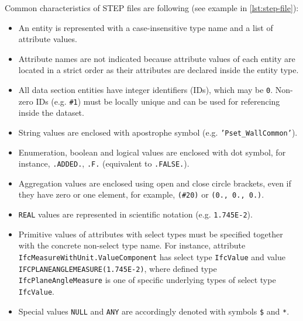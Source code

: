 Common characteristics of STEP files are following (see example in \autoref{lst:step-file}):
\begin{itemize}

    \item An entity is represented with a case-insensitive type name and a list of attribute values.    
    
    \item Attribute names are not indicated because attribute values of each entity are located in a strict order as their attributes are declared inside the entity type.
    
    \item All data section entities have integer identifiers (IDs), which may be \texttt{0}.
    Non-zero IDs (e.g. \texttt{\#1}) must be locally unique and can be used for referencing inside the dataset.
    
    \item String values are enclosed with apostrophe symbol (e.g. \texttt{'Pset\_WallCommon'}).
    
    \item Enumeration, boolean and logical values are enclosed with dot symbol, for instance, \texttt{.ADDED.}, \texttt{.F.} (equivalent to \texttt{.FALSE.}).
    
    \item Aggregation values are enclosed using open and close circle brackets, even if they have zero or one element, for example, \texttt{(\#20)} or \texttt{(0., 0., 0.)}.
    
    \item \texttt{REAL} values are represented in scientific notation (e.g. \texttt{1.745E-2}). 

    \item Primitive values of attributes with select types must be specified together with the concrete non-select type name.
    For instance, attribute \texttt{IfcMeasureWithUnit.ValueComponent} has select type \texttt{IfcValue} and value \texttt{IFCPLANEANGLEMEASURE(1.745E-2)}, where defined type \texttt{IfcPlaneAngleMeasure} is one of specific underlying types of select type \texttt{IfcValue}.
    
    \item Special values \texttt{NULL} and \texttt{ANY} are accordingly denoted with symbols \texttt{\$} and \texttt{*}.
    
    
\end{itemize}





